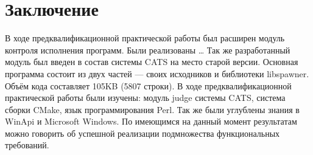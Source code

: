\documentclass{imcs}
\begin{document}
\pagebreak

\section*{Заключение}

В ходе предквалификационной практической работы был расширен модуль контроля исполнения программ. Были реализованы …
Так же разработанный модуль был введен в состав системы CATS на место старой версии.
Основная программа состоит из двух частей — своих исходников и библиотеки libspawner. Объём кода составляет 105KB (5807 строки).
В ходе предквалификационной практической работы были изучены: модуль judge системы CATS, система сборки CMake, язык программирования Perl. Так же были углублены знания в WinApi и Microsoft Windows.
По имеющимся на данный момент результатам можно говорить об успешной реализации подмножества функциональных требований.

\pagebreak
\end{document}
